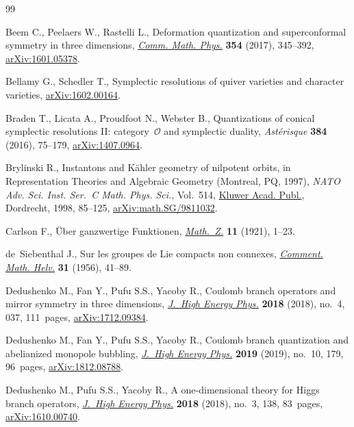 \documentclass[pdftex]{sigma}
\numberwithin{equation}{section}
\begin{document}
\begin{thebibliography}{99}
\footnotesize\itemsep=0pt

Beem C., Peelaers W., Rastelli L., Deformation quantization and superconformal
 symmetry in three dimensions, \href{https://doi.org/10.1007/s00220-017-2845-6}{\textit{Comm. Math. Phys.}} \textbf{354} (2017),
 345--392, \href{https://arxiv.org/abs/1601.05378}{arXiv:1601.05378}.

Bellamy G.,  Schedler T., Symplectic resolutions of quiver varieties and
 character varieties, \href{https://arxiv.org/abs/1602.00164}{arXiv:1602.00164}.

Braden T., Licata A., Proudfoot N., Webster B., Quantizations of conical
 symplectic resolutions {II}: category~{$\mathcal O$} and symplectic duality,
 \textit{Ast\'erisque} \textbf{384} (2016), 75--179, \href{https://arxiv.org/abs/1407.0964}{arXiv:1407.0964}.

Brylinski R., Instantons and {K}\"{a}hler geometry of nilpotent orbits, in
 Representation Theories and Algebraic Geometry ({M}ontreal, {PQ}, 1997),
 \textit{NATO Adv. Sci. Inst. Ser.~C Math. Phys. Sci.}, Vol.~514, \href{https://doi.org/10.1007/978-94-015-9131-7_3}{Kluwer Acad.
 Publ.}, Dordrecht, 1998, 85--125, \href{https://arxiv.org/abs/math.SG/9811032}{arXiv:math.SG/9811032}.

Carlson F., \"{U}ber ganzwertige {F}unktionen, \href{https://doi.org/10.1007/BF01203188}{\textit{Math.~Z.}} \textbf{11} (1921), 1--23.

de~Siebenthal J., Sur les groupes de {L}ie compacts non connexes,
 \href{https://doi.org/10.1007/BF02564352}{\textit{Comment. Math. Helv.}} \textbf{31} (1956), 41--89.

Dedushenko M., Fan Y., Pufu S.S., Yacoby R., Coulomb branch operators and
 mirror symmetry in three dimensions, \href{https://doi.org/10.1007/jhep04(2018)037}{\textit{J.~High Energy Phys.}} \textbf{2018} (2018), no.~4, 037, 111~pages, \href{https://arxiv.org/abs/1712.09384}{arXiv:1712.09384}.

Dedushenko M., Fan Y., Pufu S.S., Yacoby R., Coulomb branch quantization and
 abelianized monopole bubbling, \href{https://doi.org/10.1007/JHEP10(2019)179}{\textit{J.~High Energy Phys.}} \textbf{2019} (2019), no.~10, 179, 96~pages, \href{https://arxiv.org/abs/1812.08788}{arXiv:1812.08788}.

Dedushenko M., Pufu S.S., Yacoby R., A one-dimensional theory for {H}iggs
 branch operators, \href{https://doi.org/10.1007/jhep03(2018)138}{\textit{J.~High Energy Phys.}} \textbf{2018} (2018), no.~3, 138, 83~pages, \href{https://arxiv.org/abs/1610.00740}{arXiv:1610.00740}.


\end{thebibliography}
\end{document}
